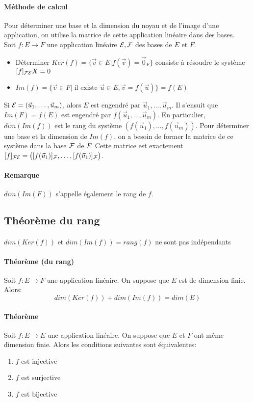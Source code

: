 \paragraph{Méthode de calcul} Pour déterminer une base et la dimension du noyau et de l'image d'une application, on utilise la matrice de cette application linéaire dans des bases. \\
Soit $f: E \rightarrow F$ une application linéaire $\mathcal{E}, \mathcal{F}$ des bases de $E$ et $F$.
\begin{itemize}
  \item Déterminer $Ker(f) = \{\vec{v} \in E \vert f(\vec{v}) = \vec{0}_F \}$ consiste à résoudre le système $[f]_{\mathcal{F} \mathcal{E}} X = 0$
  \item $Im(f) = \{ \vec{v} \in F \vert \text{ il existe } \vec{u} \in E, \vec{v} = f(\vec{u}) \} = f(E)$
\end{itemize}
Si $\mathcal{E} = (\vec{u}_1, \ldots, \vec{u}_m)$, alors $E$ est engendré par $\vec{u}_1, \ldots, \vec{u}_m$. Il s'ensuit que $Im(F) = f(E)$ est engendré par $f(\vec{u}_1, \ldots, \vec{u}_m)$. En particulier, $dim(Im(f))$ est le rang du système $(f(\vec{u}_1), \ldots, f(\vec{u}_m))$. Pour déterminer une base et la dimension de $Im(f)$, on a besoin de former la matrice de ce système dans la base $\mathcal{F}$ de $F$. Cette matrice est exactement $[f]_{\mathcal{F} \mathcal{E}} = \big([f(\vec{u}_1)]_{\mathcal{F}}, \ldots, [f(\vec{u}_1)]_{\mathcal{F}}\big)$.

\paragraph{Remarque} $dim(Im(F))$ s'appelle également le rang de $f$.

%
\subsection{Théorème du rang}
%
\paragraph{} $dim(Ker(f))$ et $dim(Im(f)) = rang(f)$ ne sont pas indépendants
\paragraph{Théorème (du rang)} Soit $f: E \rightarrow F$ une application linéaire. On suppose que $E$ est de dimension finie. Alors:
$$dim(Ker(f)) + dim(Im(f)) = dim(E)$$

\paragraph{Théorème} Soit $f: E \rightarrow E$ une application linéaire. On suppose que $E$ et $F$ ont même dimension finie. Alors les conditions suivantes sont équivalentes:
\begin{enumerate}
  \item $f$ est injective 
  \item $f$ est surjective
  \item $f$ est bijective
\end{enumerate}

